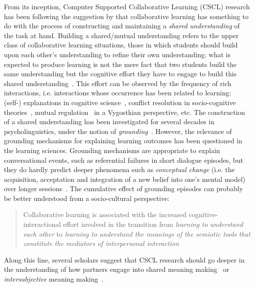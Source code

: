 \documentclass[natbib]{svjour3}
\newcommand{\ie}{i.e.\xspace}
\begin{document}
From its inception, Computer Supported Collaborative Learning (CSCL)
research has been following the suggestion by \citet{roschelle1995construction}
that collaborative learning has something to do with the process of constructing
and maintaining a \emph{shared understanding} of the task at hand. Building a
shared/mutual understanding refers to the upper class of collaborative learning
situations, those in which students should build upon each other's understanding
to refine their own understanding: what is expected to produce learning is not
the mere fact that two students build the same understanding but the cognitive
effort they have to engage to build this shared
understanding~\citep{schwartz1995emergence}. This effort can be observed by the
frequency of rich interactions, \ie interactions whose occurrence has been
related to learning: (self-) explanations in cognitive
science~\citep{chi1989self, webb1991task}, conflict resolution in
socio-cognitive theories~\citep{doise1975social}, mutual
regulation~\citep{blaye1995collaborative} in a Vygostkian perspective, etc. The
construction of a shared understanding has been investigated for several decades
in psycholinguistics, under the  notion of
\emph{grounding}~\citep{clark1986referring}. However, the relevance of grounding
mechanisms for explaining learning outcomes has been questioned in the learning
sciences. Grounding mechanisms are appropriate to explain conversational
events, such as referential failures in short dialogue episodes, but they do hardly
predict deeper phenomena such as \emph{conceptual change} (\ie the acquisition,
acceptation and integration of a new belief into one's mental model) over longer
sessions~\citep{dillenbourg2006sharing}. The cumulative effect of grounding
episodes can probably be better understood from a socio-cultural perspective:

\begin{quote}
Collaborative learning is associated with the increased
cognitive-interactional effort involved in the transition from \emph{learning to
understand each other} to \emph{learning to understand the meanings of the semiotic
tools that constitute the mediators of interpersonal
interaction}~\citep{baker1999role}
\end{quote}

Along this line, several scholars suggest that CSCL research should go deeper in
the understanding of how partners engage into shared meaning
making~\citep{stahl2007meaning} or \emph{intersubjective} meaning
making~\citep{suthers2006technology}.
\end{document}

